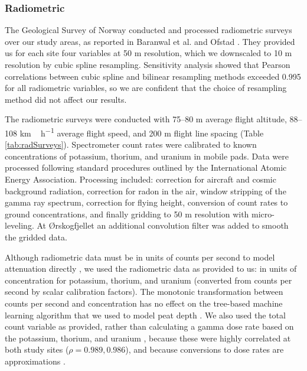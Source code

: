 \documentclass[soil, manuscript]{copernicus}
\begin{document}
\subsubsection{Radiometric}

The Geological Survey of Norway conducted and processed radiometric surveys over our study areas, as reported in Baranwal et al. \citeyearpar{baranwalHelicopterborneMagneticElectromagnetic2013} and Ofstad \citeyearpar{ofstadHelicopterborneMagneticRadiometric2015}.
They provided us for each site four variables at 50 m resolution, which we downscaled to 10 m resolution by cubic spline resampling.
Sensitivity analysis showed that Pearson correlations between cubic spline and bilinear resampling methods exceeded 0.995 for all radiometric variables, so we are confident that the choice of resampling method did not affect our results.

The radiometric surveys were conducted with 75--80 m average flight altitude, 88--108 \unit{km\,h^{-1}} average flight speed, and 200 m flight line spacing (Table \ref{tab:radSurveys}).
Spectrometer count rates were calibrated to known concentrations of potassium, thorium, and uranium in mobile pads.
Data were processed following standard procedures outlined by the International Atomic Energy Association.
Processing included: correction for aircraft and cosmic background radiation, correction for radon in the air, window stripping of the gamma ray spectrum, correction for flying height, conversion of count rates to ground concentrations, and finally gridding to 50 m resolution with micro-leveling.
At Ørskogfjellet an additional convolution filter was added to smooth the gridded data.

Although radiometric data must be in units of counts per second to model attenuation directly \citep{olearyDigitalSoilMapping2022}, we used the radiometric data as provided to us: in units of concentration for potassium, thorium, and uranium (converted from counts per second by scalar calibration factors).
The monotonic transformation between counts per second and concentration has no effect on the tree-based machine learning algorithm that we used to model peat depth \citep{hastieElementsStatisticalLearning2009}.
We also used the total count variable as provided, rather than calculating a gamma dose rate based on the potassium, thorium, and uranium \citep[as was done in][]{gatisMappingUplandPeat2019}, because these were highly correlated at both study sites (\(\rho = 0.989, 0.986\)), and because conversions to dose rates are approximations \citep{iaeaGuidelinesRadioelementMapping2003}.
\end{document}
